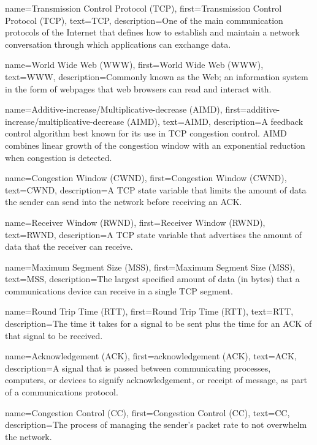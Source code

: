 {
    name={Transmission Control Protocol (TCP)},
    first={Transmission Control Protocol (TCP)},
    text={TCP},
    description={One of the main communication protocols of the Internet that defines how to establish and maintain a network conversation through which applications can exchange data.}
}

{
    name={World Wide Web (WWW)},
    first={World Wide Web (WWW)},
    text={WWW},
    description={Commonly known as the Web; an information system in the form of webpages that web browsers can read and interact with.}
}

{
    name={Additive-increase/Multiplicative-decrease (AIMD)},
    first={additive-increase/multiplicative-decrease (AIMD)},
    text={AIMD},
    description={A feedback control algorithm best known for its use in TCP congestion control. AIMD combines linear growth of the congestion window with an exponential reduction when congestion is detected.}
}

{
    name={Congestion Window (CWND)},
    first={Congestion Window (CWND)},
    text={CWND},
    description={A TCP state variable that limits the amount of data the sender can send into the network before receiving an ACK.}
}

{
    name={Receiver Window (RWND)},
    first={Receiver Window (RWND)},
    text={RWND},
    description={A TCP state variable that advertises the amount of data that the receiver can receive.}
}

{
    name={Maximum Segment Size (MSS)},
    first={Maximum Segment Size (MSS)},
    text={MSS},
    description={The largest specified amount of data (in bytes) that a communications device can receive in a single TCP segment.}
}

{
    name={Round Trip Time (RTT)},
    first={Round Trip Time (RTT)},
    text={RTT},
    description={The time it takes for a signal to be sent plus the time for an ACK of that signal to be received.}
}

{
    name={Acknowledgement (ACK)},
    first={acknowledgement (ACK)},
    text={ACK},
    description={A signal that is passed between communicating processes, computers, or devices to signify acknowledgement, or receipt of message, as part of a communications protocol.}
}

{
    name={Congestion Control (CC)},
    first={Congestion Control (CC)},
    text={CC},
    description={The process of managing the sender's packet rate to not overwhelm the network.}
}


